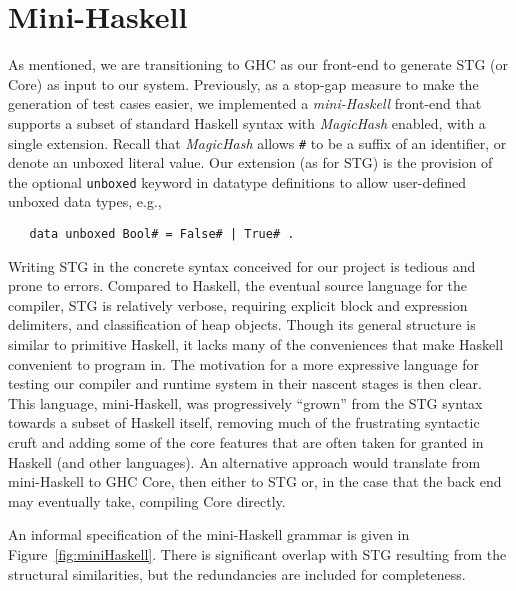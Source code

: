 \documentclass{llncs}
\begin{document}
\section{Mini-Haskell}
\label{app:minihaskell}
As mentioned, we are transitioning to GHC as our front-end to
generate STG (or Core) as input to our system.  Previously, as a stop-gap
measure to make the generation of test cases easier, we implemented a
\emph{mini-Haskell} front-end that supports a subset of standard Haskell
syntax with \emph{MagicHash} enabled, with a single extension.  Recall that
\emph{MagicHash} allows \texttt{\#} to be a suffix of an identifier, or denote
an unboxed literal value.  Our extension (as for STG) is the provision of
the optional \texttt{unboxed} keyword in datatype definitions to allow
user-defined unboxed data types, e.g.,
{\footnotesize
\begin{verbatim}
   data unboxed Bool# = False# | True# .
\end{verbatim}}

Writing STG in the concrete syntax conceived for our project is tedious and
prone to errors.  Compared to Haskell, the eventual source language for the
compiler, STG is relatively verbose, requiring explicit block and expression
delimiters, and classification of heap objects. Though its general structure
is similar to primitive Haskell, it lacks many of the conveniences that make
Haskell convenient to program in.  The motivation for a more expressive
language for testing our compiler and runtime system in their nascent stages
is then clear.  This language, mini-Haskell, was progressively ``grown'' from
the STG syntax towards a subset of Haskell itself, removing much of the
frustrating syntactic cruft and adding some of the core features that are
often taken for granted in Haskell (and other languages).  An alternative
approach would translate from mini-Haskell to GHC Core, then either to STG or,
in the case that the back end may eventually take, compiling Core directly.

An informal specification of the mini-Haskell grammar is given in
Figure~\ref{fig:miniHaskell}.  There is significant overlap with STG resulting
from the structural similarities, but the redundancies are included for
completeness.



\end{document}
